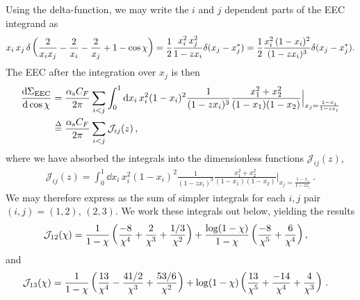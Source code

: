 Using the delta-function, we may write the \(i\) and \(j\) dependent parts of the EEC integrand as
\begin{align}
    x_i\,x_j\,
    \delta\left(
        \frac{2}{x_i x_j} - \frac{2}{x_i} - \frac{2}{x_j} + 1
        -
        \cos\chi
    \right)
    =
    \frac{1}{2}
    \frac{x_i^2\,x_j^2}{1 - z x_i}
    \delta(x_j - x_j^*)
    =
    \frac{1}{2}
    \frac{x_i^2\,(1-x_i)^2}{(1 - z x_i)^3}
    \delta(x_j - x_j^*)
    .
\end{align}
%
The EEC after the integration over \(x_j\) is then
\begin{align}
    \dv{\Sigma_\text{EEC}}{\cos\chi}{}
    &=
    \frac{\alpha_{\mathrm{s}} C_F}{2\pi}
    \sum_{i<j}
    \int_0^1 \dd x_i\,
    x_i^2 (1 - x_i)^2
    \frac{1}{(1- z x_i)^3}
    \frac{x_1^2 + x_2^2}{(1-x_1)(1-x_2)}
    \Big|_{x_j = \frac{1-x_i}{1-z x_i}}
    \\
    &
    \overset{\Delta}{=}
    \frac{\alpha_{\mathrm{s}} C_F}{2\pi}
    \sum_{i<j}
    {\mathcal{J}}_{ij}(z)
    \,,
\end{align}
where we have absorbed the integrals into the dimensionless functions \(\mathcal{J}_{ij}(z)\),
\begin{align}
    {\mathcal{J}}_{ij}(z)
    =
    \int_0^1 \dd x_i\,
    x_i^2 (1 - x_i)^2
    \frac{1}{(1- z x_i)^3}
    \frac{x_1^2 + x_2^2}{(1-x_1)(1-x_2)}
    \Big|_{x_j = \frac{1-x_i}{1-z x_i}}
    \label{eq:eec_integrals}
    \,.
\end{align}
%
We may therefore express  as the sum of simpler integrals for each \(i, j\) pair \((i, j) = (1,2),\,(2,3)\).
%
We work these integrals out below, yielding the results
\begin{align}
    \mathcal{J}_{12}(\chi)
    &=
   \frac{1}{1-\chi}
   \left(
    \frac{-8}{\chi^4} + \frac{2}{\chi^3} + \frac{1/3}{\chi^2}
   \right)
   +
   \frac{\log(1-\chi)}{1-\chi}
   \left(
    \frac{-8}{\chi^5} + \frac{6}{\chi^4}
   \right)
    ,
\end{align}
and
\begin{align}
    \mathcal{J}_{13}(\chi)
    &=
    \frac{1}{1-\chi} \left(
        \frac{13}{\chi^4}
        -
        \frac{41/2}{\chi^3}
        +
        \frac{53/6}{\chi^2}
    \right)
    +
    \log(1-\chi)\left(
        \frac{13}{\chi^5}
        +
        \frac{-14}{\chi^4}
        +
        \frac{4}{\chi^3}
    \right)
    \,.
\end{align}

